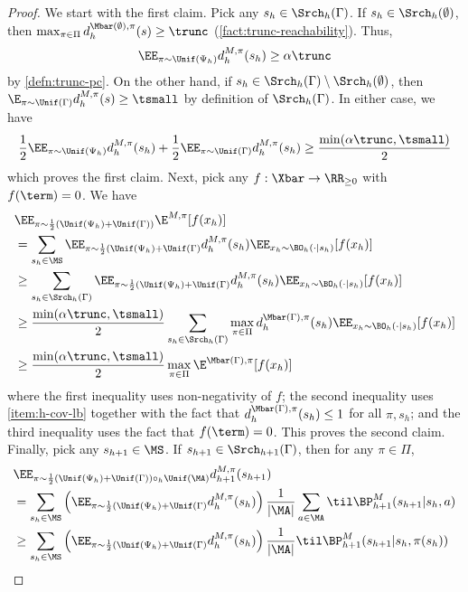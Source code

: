 \begin{proof}
We start with the first claim. Pick any $s_h \in \Srch_h(\Gamma)$. If $s_h \in \Srch_h(\emptyset)$, then $\max_{\pi\in\Pi} d^{\Mbar(\emptyset),\pi}_h(s) \geq \trunc$ (\cref{fact:trunc-reachability}). Thus, \[\EE_{\pi\sim\Unif(\Psi_h)} d^{M,\pi}_h(s_h) \geq \alpha\trunc\] by \cref{defn:trunc-pc}. On the other hand, if $s_h \in \Srch_h(\Gamma)\setminus\Srch_h(\emptyset)$, then $\E_{\pi\sim\Unif(\Gamma)} d^{M,\pi}_h(s) \geq \tsmall$ by definition of $\Srch_h(\Gamma)$. In either case, we have
\[\frac{1}{2}\EE_{\pi\sim\Unif(\Psi_h)} d^{M,\pi}_h(s_h) + \frac{1}{2}\EE_{\pi\sim\Unif(\Gamma)} d^{M,\pi}_h(s_h) \geq \frac{\min(\alpha\trunc,\tsmall)}{2}\]
which proves the first claim. Next, pick any $f:\Xbar\to\RR_{\geq 0}$ with $f(\term)=0$. We have
\begin{align*}
&\EE_{\pi\sim\frac{1}{2}(\Unif(\Psi_h)+\Unif(\Gamma))} \E^{M,\pi}[f(x_h)] \\ 
&= \sum_{s_h \in \MS} \EE_{\pi\sim\frac{1}{2}(\Unif(\Psi_h)+\Unif(\Gamma)} d^{M,\pi}_h(s_h) \EE_{x_h \sim \BO_h(\cdot|s_h)}[f(x_h)] \\ 
&\geq \sum_{s_h \in \Srch_h(\Gamma)} \EE_{\pi\sim\frac{1}{2}(\Unif(\Psi_h)+\Unif(\Gamma)} d^{M,\pi}_h(s_h) \EE_{x_h \sim \BO_h(\cdot|s_h)}[f(x_h)] \\ 
&\geq \frac{\min(\alpha\trunc,\tsmall)}{2} \sum_{s_h \in \Srch_h(\Gamma)} \max_{\pi\in\Pi} d^{\Mbar(\Gamma),\pi}_h(s_h) \EE_{x_h \sim \BO_h(\cdot|s_h)}[f(x_h)] \\ 
&\geq \frac{\min(\alpha\trunc,\tsmall)}{2} \max_{\pi\in\Pi} \E^{\Mbar(\Gamma),\pi}[f(x_h)]
\end{align*}
where the first inequality uses non-negativity of $f$; the second inequality uses \cref{item:h-cov-lb} together with the fact that $d^{\Mbar(\Gamma),\pi}_h(s_h) \leq 1$ for all $\pi,s_h$; and the third inequality uses the fact that $f(\term) = 0$. This proves the second claim. Finally, pick any $s_{h+1} \in \MS$. If $s_{h+1} \in \Srch_{h+1}(\Gamma)$, then for any $\pi \in \Pi$,
\begin{align*}
&\EE_{\pi\sim\frac{1}{2}(\Unif(\Psi_h)+\Unif(\Gamma))\circ_h \Unif(\MA)} d^{M,\pi}_{h+1}(s_{h+1}) \\ 
&= \sum_{s_h \in \MS} \left(\EE_{\pi\sim\frac{1}{2}(\Unif(\Psi_h)+\Unif(\Gamma)} d^{M,\pi}_h(s_h)\right) \frac{1}{|\MA|}\sum_{a \in \MA} \til\BP^M_{h+1}(s_{h+1}|s_h,a) \\ 
&\geq \sum_{s_h \in \MS} \left(\EE_{\pi\sim\frac{1}{2}(\Unif(\Psi_h)+\Unif(\Gamma)} d^{M,\pi}_h(s_h)\right) \frac{1}{|\MA|} \til\BP^M_{h+1}(s_{h+1}|s_h,\pi(s_h)) \\

\end{align*}
\end{proof}
